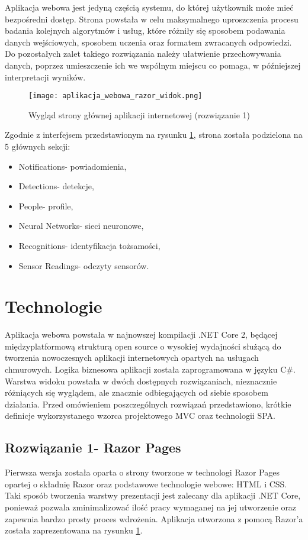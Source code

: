 Aplikacja webowa jest jedyną częścią systemu, do której użytkownik może mieć bezpośredni dostęp. Strona powstała w celu maksymalnego uproszczenia procesu badania kolejnych algorytmów i usług, które różniły się sposobem podawania danych wejściowych, sposobem uczenia oraz formatem zwracanych odpowiedzi. Do pozostałych zalet takiego rozwiązania należy ułatwienie przechowywania danych, poprzez umieszczenie ich we wspólnym miejscu co pomaga, w późniejszej interpretacji wyników.
\begin{figure}[H]
	\centering
	\texttt{[image: aplikacja\_webowa\_razor\_widok.png]}
	\caption{Wygląd strony głównej aplikacji internetowej (rozwiązanie 1)}
	\label{fig:strona_glowna_razor}
\end{figure}
\pagebreak
Zgodnie z interfejsem przedstawionym na rysunku \ref{fig:strona_glowna_razor}, strona została podzielona na 5 głównych sekcji:
\begin{itemize}
\item Notifications- powiadomienia,
\item Detections- detekcje,
\item People- profile,
\item Neural Networks- sieci neuronowe,
\item Recognitions- identyfikacja tożsamości,
\item Sensor Readings- odczyty sensorów.
\end{itemize}

\section{Technologie}
Aplikacja webowa powstała w najnowszej kompilacji .NET Core 2, będącej międzyplatformową strukturą open source o wysokiej wydajności służącą do tworzenia nowoczesnych aplikacji internetowych opartych na usługach chmurowych. Logika biznesowa aplikacji została zaprogramowana w języku C\#. Warstwa widoku powstała w dwóch dostępnych rozwiązaniach, nieznacznie różniących się wyglądem, ale znacznie odbiegających od siebie sposobem działania. Przed omówieniem poszczególnych rozwiązań przedstawiono, krótkie definicje wykorzystanego wzorca projektowego MVC oraz technologii SPA. 

\subsection{Rozwiązanie 1- Razor Pages}
Pierwsza wersja została oparta o strony tworzone w technologi Razor Pages opartej o składnię Razor oraz podstawowe technologie webowe: HTML i CSS. Taki sposób tworzenia warstwy prezentacji jest zalecany dla aplikacji .NET Core, ponieważ pozwala zminimalizować ilość pracy wymaganej na jej utworzenie oraz zapewnia bardzo prosty proces wdrożenia. Aplikacja utworzona z pomocą Razor'a została zaprezentowana na rysunku \ref{fig:strona_glowna_razor}.


